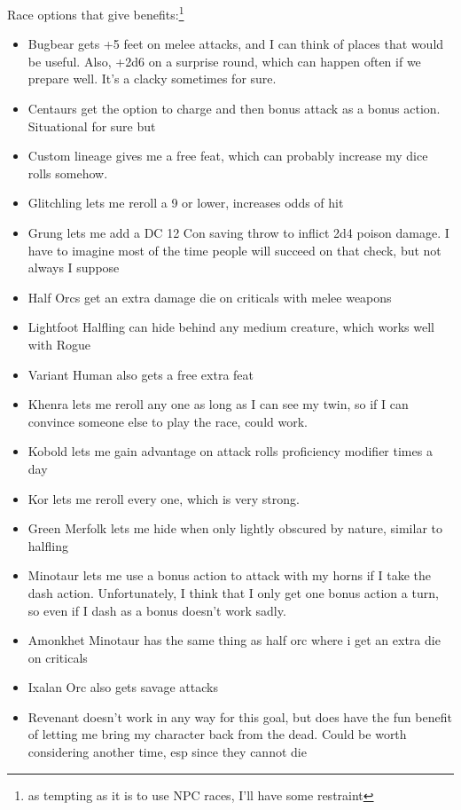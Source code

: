 \documentclass[12pt]{article}[titlepage]
\renewcommand{\,}{\textsuperscript{,}}
\begin{document}
Race options that give benefits:\footnote{as tempting as it is to use NPC races, I'll have some restraint}
\begin{itemize}
\item Bugbear gets +5 feet on melee attacks, and I can think of places that would be useful.
Also, +2d6 on a surprise round, which can happen often if we prepare well.
It's a clacky sometimes for sure.
\item Centaurs get the option to charge and then bonus attack as a bonus action. Situational for sure but
\item Custom lineage gives me a free feat, which can probably increase my dice rolls somehow.
\item Glitchling lets me reroll a 9 or lower, increases odds of hit
\item Grung lets me add a DC 12 Con saving throw to inflict 2d4 poison damage. I have to imagine most of the time people will succeed on that check, but not always I suppose
\item Half Orcs get an extra damage die on criticals with melee weapons
\item Lightfoot Halfling can hide behind any medium creature, which works well with Rogue
\item Variant Human also gets a free extra feat
\item Khenra lets me reroll any one as long as I can see my twin, so if I can convince someone else to play the race, could work.
\item Kobold lets me gain advantage on attack rolls proficiency modifier times a day
\item Kor lets me reroll every one, which is very strong.
\item Green Merfolk lets me hide when only lightly obscured by nature, similar to halfling
\item Minotaur lets me use a bonus action to attack with my horns if I take the dash action. Unfortunately, I think that I only get one bonus action a turn, so even if I dash as a bonus doesn't work sadly.
\item Amonkhet Minotaur has the same thing as half orc where i get an extra die on criticals
\item Ixalan Orc also gets savage attacks
\item Revenant doesn't work in any way for this goal, but does have the fun benefit of letting me bring my character back from the dead.
Could be worth considering another time, esp since they cannot die
\end{itemize}
\end{document}
